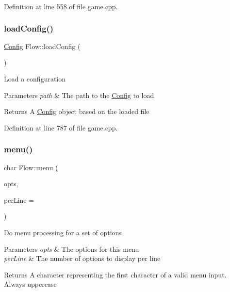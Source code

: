 Definition at line 558 of file game.\+cpp.

\hypertarget{namespace_flow_a6f9081155759b0d9a6545badc4603044}{}\label{namespace_flow_a6f9081155759b0d9a6545badc4603044} 
\subsubsection{\texorpdfstring{load\+Config()}{loadConfig()}}
{\footnotesize\ttfamily \hyperlink{struct_flow_1_1_config}{Config} Flow\+::load\+Config (\begin{DoxyParamCaption}\item[{const std\+::string \&}]{ }\end{DoxyParamCaption})}

Load a configuration 
\begin{DoxyParams}{Parameters}
{\em path} & The path to the \hyperlink{struct_flow_1_1_config}{Config} to load \\
\hline
\end{DoxyParams}
\begin{DoxyReturn}{Returns}
A \hyperlink{struct_flow_1_1_config}{Config} object based on the loaded file 
\end{DoxyReturn}


Definition at line 787 of file game.\+cpp.

\hypertarget{namespace_flow_a77375f0311e9ec10f181058d624dba17}{}\label{namespace_flow_a77375f0311e9ec10f181058d624dba17} 
\subsubsection{\texorpdfstring{menu()}{menu()}}
{\footnotesize\ttfamily char Flow\+::menu (\begin{DoxyParamCaption}\item[{const \hyperlink{class_collections_1_1_linked_list}{Collections\+::\+Linked\+List}$<$ std\+::string $>$ \&}]{opts,  }\item[{int}]{per\+Line = {} }\end{DoxyParamCaption})}

Do menu processing for a set of options 
\begin{DoxyParams}{Parameters}
{\em opts} & The options for this menu \\
\hline
{\em per\+Line} & The number of options to display per line \\
\hline
\end{DoxyParams}
\begin{DoxyReturn}{Returns}
A character representing the first character of a valid menu input. Always uppercase 
\end{DoxyReturn}


